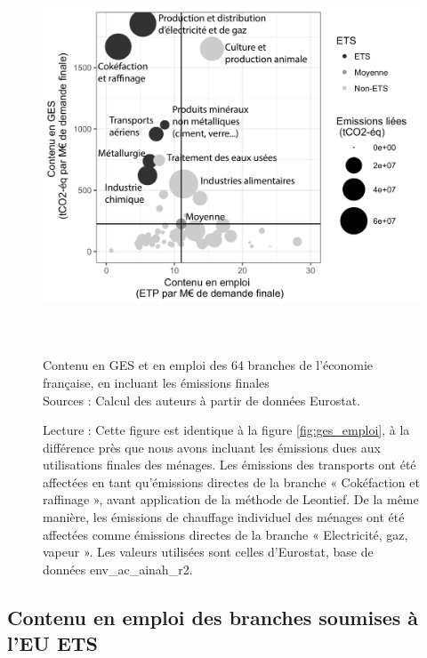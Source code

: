 \begin{figure}[!h]
	\centering
	\includegraphics[height=11cm]{figures/GES_et_emplois/GES_menages_emploi.pdf}
	\caption{Contenu en GES et en emploi des 64 branches de l'économie française, en incluant les émissions finales \\
		Sources : Calcul des auteurs à partir de données Eurostat.}
	\label{fig:ges_menages_emploi}
	\captionsetup{justification=raggedright}
	\caption*{Lecture : Cette figure est identique à la figure \ref{fig:ges_emploi}, à la différence près que nous avons incluant les émissions dues aux utilisations finales des ménages. Les émissions des transports ont été affectées en tant qu’émissions directes de la branche « Cokéfaction et raffinage », avant application de la méthode de Leontief. De la même manière, les émissions de chauffage individuel des ménages ont été affectées comme émissions directes de la branche « Electricité, gaz, vapeur ». Les valeurs utilisées sont celles d'Eurostat, base de données env\_ac\_ainah\_r2.}
\end{figure}

\clearpage
\subsection{Contenu en emploi des branches soumises à l'EU ETS}
\label{app:EU_ETS}

